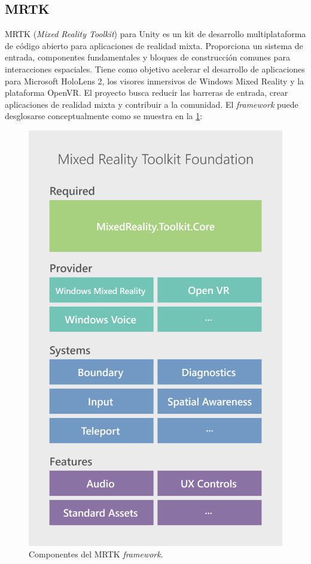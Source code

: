 

\subsection{MRTK}

MRTK (\textit{Mixed Reality Toolkit}) para Unity es un kit de desarrollo multiplataforma de código abierto para aplicaciones de realidad mixta. Proporciona un sistema de entrada, componentes fundamentales y bloques de construcción comunes para interacciones espaciales. Tiene como objetivo acelerar el desarrollo de aplicaciones para Microsoft HoloLens 2, los visores inmersivos de Windows Mixed Reality y la plataforma OpenVR. El proyecto busca reducir las barreras de entrada, crear aplicaciones de realidad mixta y contribuir a la comunidad. El \textit{framework} puede desglosarse conceptualmente como se muestra en la \ref{fig:mrtk}:

\begin{figure}[htpb]
	\centering
	\includegraphics[scale=0.14]{./Figures/mrtk.png}
	\caption{Componentes del MRTK \textit{framework}\protect\footnotemark.}
	\label{fig:mrtk}
\end{figure}

